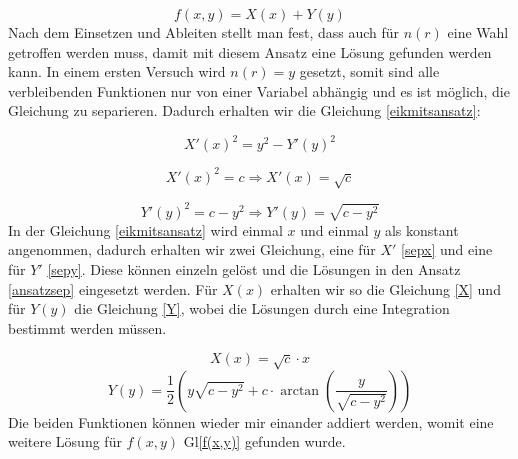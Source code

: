 \begin{refsection}
\begin{equation}\label{ansatzsep}
f(x,y)=X(x) + Y(y)
\end{equation}
Nach dem Einsetzen und Ableiten stellt man fest, dass auch für $n(r)$ eine Wahl getroffen werden muss, damit mit diesem Ansatz eine Lösung gefunden werden kann. In einem ersten Versuch wird $n(r)=y$ gesetzt, somit sind alle verbleibenden Funktionen nur von einer Variabel abhängig und es ist möglich, die Gleichung zu separieren. Dadurch erhalten wir die Gleichung \eqref{eikmitsansatz}:

\begin{equation}\label{eikmitsansatz}
X'(x)^{2}=y^{2}-Y'(y)^{2}
\end{equation}

\begin{equation}\label{sepx}
X'(x)^{2}=c \Rightarrow X'(x)=\sqrt{c}
\end{equation}

\begin{equation}\label{sepy}
Y'(y)^{2}=c-y^{2}  \Rightarrow Y'(y)=\sqrt{c-y^{2}}
\end{equation}
In der Gleichung \eqref{eikmitsansatz} wird einmal $x$ und einmal $y$ als konstant angenommen, dadurch erhalten wir zwei Gleichung, eine für $X'$ \eqref{sepx} und eine für $Y'$ \eqref{sepy}. Diese können einzeln gelöst und die Lösungen in den Ansatz \eqref{ansatzsep} eingesetzt werden. Für $X(x)$ erhalten wir so die Gleichung \eqref{X} und für $Y(y)$ die Gleichung \eqref{Y}, wobei die Lösungen durch eine Integration bestimmt werden müssen.

\begin{equation}\label{X}
X(x)=\sqrt{c}\cdot x
\end{equation}
\begin{equation}\label{Y}
Y(y)=\dfrac{1}{2}\left(y \sqrt{c-y^{2}}+c \cdot \arctan\left(  \dfrac{y}{\sqrt{c-y^{2}}}\right) \right) 
\end{equation}
Die beiden Funktionen können wieder mir einander addiert werden, womit eine weitere Lösung für $f(x,y)$  Gl\eqref{f(x,y)} gefunden wurde.


\end{refsection}
